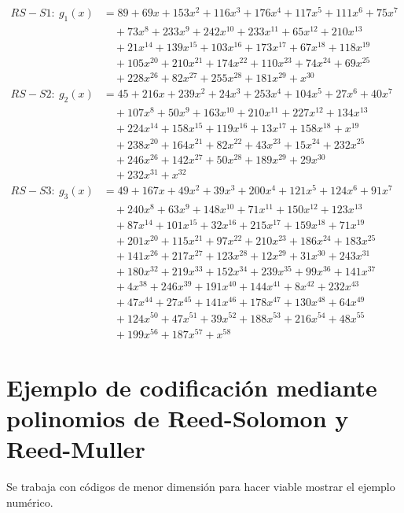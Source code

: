 \begin{align*}
	RS-S1: \ g_{1}(x) &= 89 
	+ 69x + 153x^{2} + 116x^{3} + 176x^{4} + 117x^{5} + 111x^{6} + 75x^{7} \\
	&\quad + 73x^{8} + 233x^{9} + 242x^{10} + 233x^{11} + 65x^{12} + 210x^{13} \\
	&\quad + 21x^{14} + 139x^{15} + 103x^{16} + 173x^{17} + 67x^{18} + 118x^{19} \\
	&\quad + 105x^{20} + 210x^{21} + 174x^{22} + 110x^{23} + 74x^{24} + 69x^{25} \\
	&\quad + 228x^{26} + 82x^{27} + 255x^{28} + 181x^{29} + x^{30}
	\\[1em]
	RS-S2: \ g_{2}(x) &= 45 
	+ 216x + 239x^{2} + 24x^{3} + 253x^{4} + 104x^{5} + 27x^{6} + 40x^{7} \\
	&\quad + 107x^{8} + 50x^{9} + 163x^{10} + 210x^{11} + 227x^{12} + 134x^{13} \\
	&\quad + 224x^{14} + 158x^{15} + 119x^{16} + 13x^{17} + 158x^{18} + x^{19} \\
	&\quad + 238x^{20} + 164x^{21} + 82x^{22} + 43x^{23} + 15x^{24} + 232x^{25} \\
	&\quad + 246x^{26} + 142x^{27} + 50x^{28} + 189x^{29} + 29x^{30} \\
	&\quad + 232x^{31} + x^{32}
	\\[1em]
	RS-S3: \ g_{3}(x) &= 49 
	+ 167x + 49x^{2} + 39x^{3} + 200x^{4} + 121x^{5} + 124x^{6} + 91x^{7} \\
	&\quad + 240x^{8} + 63x^{9} + 148x^{10} + 71x^{11} + 150x^{12} + 123x^{13} \\
	&\quad + 87x^{14} + 101x^{15} + 32x^{16} + 215x^{17} + 159x^{18} + 71x^{19} \\
	&\quad + 201x^{20} + 115x^{21} + 97x^{22} + 210x^{23} + 186x^{24} + 183x^{25} \\
	&\quad + 141x^{26} + 217x^{27} + 123x^{28} + 12x^{29} + 31x^{30} + 243x^{31} \\
	&\quad + 180x^{32} + 219x^{33} + 152x^{34} + 239x^{35} + 99x^{36} + 141x^{37} \\
	&\quad + 4x^{38} + 246x^{39} + 191x^{40} + 144x^{41} + 8x^{42} + 232x^{43} \\
	&\quad + 47x^{44} + 27x^{45} + 141x^{46} + 178x^{47} + 130x^{48} + 64x^{49} \\
	&\quad + 124x^{50} + 47x^{51} + 39x^{52} + 188x^{53} + 216x^{54} + 48x^{55} \\
	&\quad + 199x^{56} + 187x^{57} + x^{58}
\end{align*}

\chapter{Ejemplo de codificación mediante polinomios de Reed-Solomon y Reed-Muller}
\label{chap:ReedSM}
Se trabaja con códigos de menor dimensión para hacer viable mostrar el ejemplo numérico.
\newline

